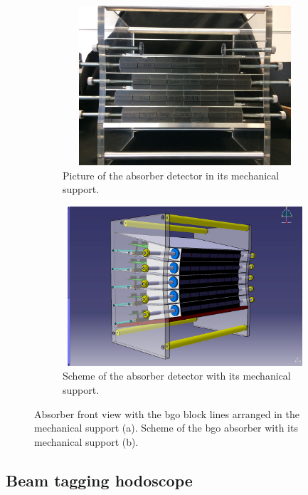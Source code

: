 \begin{figure}
\begin{subfigure}[b]{.5\textwidth}
\centering
\includegraphics[width=1\textwidth, height=16em]{03_GraphicFiles/chapter3_CLaRySproto/Absorber/images/absorber_picture.JPG}
\caption{Picture of the absorber detector in its mechanical support.}
\label{chap3::fig::absorberPicture}
\end{subfigure}
\begin{subfigure}[b]{.5\textwidth}
\centering
\includegraphics[width=1\textwidth, height=16em]{03_GraphicFiles/chapter3_CLaRySproto/Absorber/images/Absorbeur.jpg}
\caption{Scheme of the absorber detector with its mechanical support.}
\label{chap3::fig::absorber30Scheme}
\end{subfigure}
\caption{Absorber front view with the \gls{bgo} block lines arranged in the mechanical support (a). Scheme of the \gls{bgo} absorber with its mechanical support (b).}
\label{chap3::fig::absorber_scheme}
\end{figure}


\subsection{Beam tagging hodoscope}\label{chap3::subsec::hodoscope}

